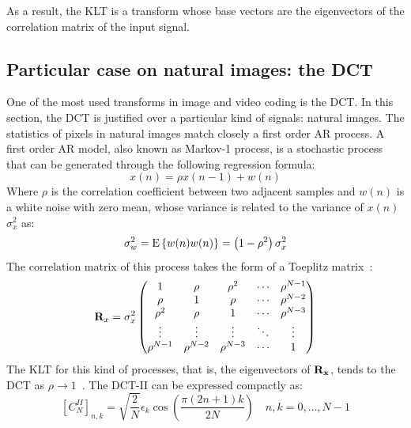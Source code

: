 \documentclass[11pt,a4paper,openright,twoside]{book}
\numberwithin{equation}{section} %
\numberwithin{figure}{section} %
\numberwithin{table}{section} %
\begin{document}
As a result, the \ac{KLT} is a transform whose base vectors are the
eigenvectors of the correlation matrix of the input signal.

\subsection{Particular case on natural images: the \acs{DCT}}
\label{sub:particular_case_dct}

One of the most used transforms in image and video coding is the
\acf{DCT}.
In this section, the \ac{DCT} is justified over a particular kind
of signals: natural images.
The statistics of pixels in natural images match closely a first order
\ac{AR} process.
A first order \ac{AR} model, also known as Markov-1 process, is a stochastic
process that can be generated through the following regression formula:
\begin{equation}
	x(n) = \rho x(n-1) + w(n)
	\label{eqn:first_order_ar_model}
\end{equation}
Where $\rho$ is the correlation coefficient between two adjacent samples
and $w(n)$ is a white noise with zero mean, whose variance is related to
the variance of $x(n)$ $\sigma_x^2$ as:
\begin{equation}
	\sigma_w^2 = \text{E}\left\{ w(n) w(n) \right\} =
	\left(1-\rho^2\right)\sigma_x^2
\end{equation}
The correlation matrix of this process takes the form of a Toeplitz
matrix~\cite{akansu-12-toeplitz-approximation}:
\begin{equation}
	\mathbf{R}_x = \sigma_x^2
	\begin{pmatrix}
		1          & \rho       & \rho^2     & \cdots & \rho^{N-1} \\
		\rho       & 1          & \rho       & \cdots & \rho^{N-2} \\
		\rho^2     & \rho       & 1          & \cdots & \rho^{N-3} \\
		\vdots     & \vdots     & \vdots     & \ddots & \vdots     \\
		\rho^{N-1} & \rho^{N-2} & \rho^{N-3} & \cdots & 1
	\end{pmatrix}
	\label{eqn:toeplitz_matrix}
\end{equation}
The \ac{KLT} for this kind of processes, that is, the eigenvectors of
$\mathbf{R}_{\mathbf{x}}$, tends to the \ac{DCT} as $\rho\to1$~\cite{britanak-06-dct-and-dst}.
The \ac{DCT}-II can be expressed compactly as:
\begin{equation}
	{\left[C_{N}^{II} \right]}_{n,k} =
	\sqrt{\frac{2}{N}}\epsilon_k\cos\left(\frac{\pi(2n+1)k}{2N}\right)
	\quad
	n,k=0,\dots,N-1
	\label{eqn:dct_ii}
\end{equation}
\end{document}

